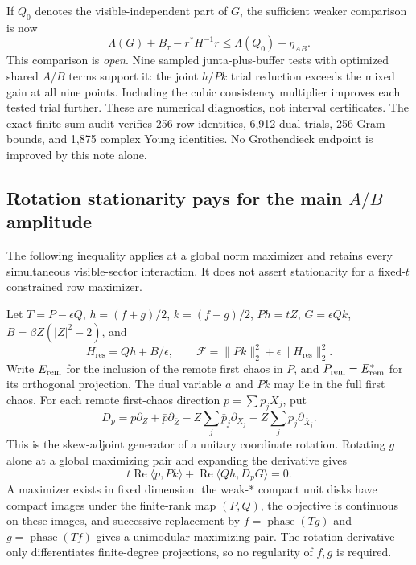 If $Q_0$ denotes the visible-independent part of $G$, the sufficient weaker
comparison is now
\[
 \Lambda(G)+B_\tau-r^*H^{-1}r\le\Lambda(Q_0)+\eta_{AB}.
\]
This comparison is \emph{open}. Nine sampled junta-plus-buffer tests with
optimized shared $A/B$ terms support it: the joint $h/Pk$ trial reduction
exceeds the mixed gain at all nine points. Including the cubic consistency
multiplier improves each tested trial further. These are numerical diagnostics,
not interval certificates. The exact finite-sum audit verifies 256 row
identities, 6,912 dual trials, 256 Gram bounds, and 1,875 complex Young
identities. No Grothendieck endpoint is improved by this note alone.


\subsection{Rotation stationarity pays for the main $A/B$ amplitude}\label{sec:weakk-rotation}
The following inequality applies at a global norm maximizer and retains every
simultaneous visible-sector interaction. It does not assert stationarity for a
fixed-$t$ constrained row maximizer.

Let $T=P-\epsilon Q$, $h=(f+g)/2$, $k=(f-g)/2$, $Ph=tZ$,
$G=\epsilon Qk$, $B=\beta Z(|Z|^2-2)$, and
\[
 H_{\mathrm{res}}=Qh+B/\epsilon,\qquad
 \mathcal F=\|Pk\|_2^2+\epsilon\|H_{\mathrm{res}}\|_2^2.
\]
Write $E_{\rm rem}$ for the inclusion of the remote first chaos in $P$,
and $P_{\rm rem}=E_{\rm rem}^*$ for its orthogonal projection. The dual
variable $a$ and $Pk$ may lie in the full first chaos.
For each remote first-chaos direction $p=\sum p_jX_j$, put
\[
 D_p=p\partial_Z+\bar p\partial_{\bar Z}
   -Z\sum_j\bar p_j\partial_{X_j}
   -\bar Z\sum_jp_j\partial_{\bar X_j}.
\]
This is the skew-adjoint generator of a unitary coordinate rotation. Rotating
$g$ alone at a global maximizing pair and expanding the derivative gives
\[
 t\operatorname{Re}\langle p,Pk\rangle+
 \operatorname{Re}\langle Qh,D_pG\rangle=0.
\]
A maximizer exists in fixed dimension: the weak-* compact unit disks have
compact images under the finite-rank map $(P,Q)$, the objective is continuous
on these images, and successive replacement by $f=\operatorname{phase}(Tg)$
and $g=\operatorname{phase}(Tf)$ gives a unimodular maximizing pair. The
rotation derivative only differentiates finite-degree projections, so no
regularity of $f,g$ is required.

